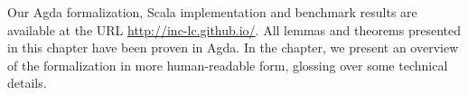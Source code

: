 
Our Agda formalization, Scala implementation and benchmark
results are available at the URL
\url{http://inc-lc.github.io/}.
All lemmas and theorems presented
in this chapter have been proven in Agda.
In the chapter, we present an overview of
the formalization in more human-readable form, glossing over some
technical details.

